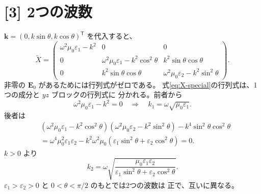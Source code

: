 \documentclass[11pt,a4paper]{article}
\begin{document}
\section*{[3] 2つの波数}
$\boldsymbol{k}=(0,k\sin\theta,k\cos\theta)^{\mathsf T}$ を代入すると、
\begin{equation}
 \tilde X=
 \begin{pmatrix}
  \omega^2\mu_0\varepsilon_1-k^2&0&0\\
  0&\omega^2\mu_0\varepsilon_1-k^2\cos^2\theta&k^2\sin\theta\cos\theta\\
  0&k^2\sin\theta\cos\theta&\omega^2\mu_0\varepsilon_2-k^2\sin^2\theta
 \end{pmatrix}.
 \label{eq:X-special}
\end{equation}
非零の $\boldsymbol{E}_0$ があるためには行列式がゼロである。
式\eqref{eq:X-special}の行列式は、1つの成分と $yz$ ブロックの行列式に
分かれる。前者から
\begin{equation}
 \omega^2\mu_0\varepsilon_1-k^2=0
 \quad\Longrightarrow\quad
 k_1=\omega\sqrt{\mu_0\varepsilon_1}.
\end{equation}
後者は
\begin{align}
 &(\omega^2\mu_0\varepsilon_1-k^2\cos^2\theta)
   (\omega^2\mu_0\varepsilon_2-k^2\sin^2\theta)
   -k^4\sin^2\theta\cos^2\theta\\
 &=\omega^4\mu_0^2\varepsilon_1\varepsilon_2
   -k^2\omega^2\mu_0(\varepsilon_1\sin^2\theta
                      +\varepsilon_2\cos^2\theta)=0.
\end{align}
$k>0$ より
\begin{equation}
 k_2=\omega\sqrt{
 \frac{\mu_0\varepsilon_1\varepsilon_2}
 {\varepsilon_1\sin^2\theta+\varepsilon_2\cos^2\theta}}.
 \label{eq:k2}
\end{equation}
$\varepsilon_1>\varepsilon_2>0$ と $0<\theta<\pi/2$ のもとでは2つの波数は
正で、互いに異なる。
\end{document}
